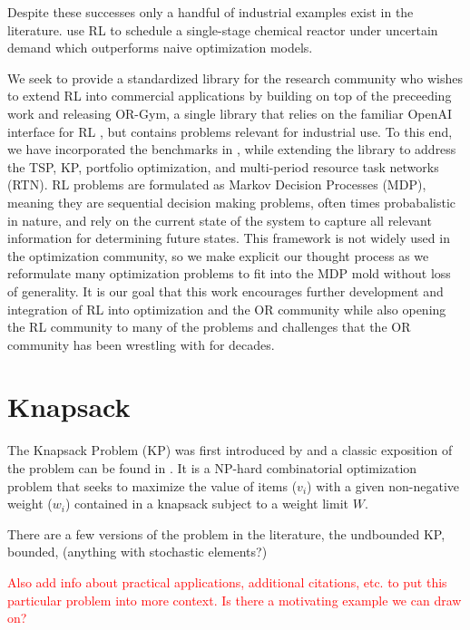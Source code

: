 \documentclass[12pt]{article}
\begin{document}
Despite these successes only a handful of industrial examples exist in the literature. 
\citet{Hubbs2020} use RL to schedule a single-stage chemical reactor under uncertain demand which outperforms naive optimization models. 

We seek to provide a standardized library for the research community who wishes to extend RL into commercial applications by building on top of the preceeding work and releasing OR-Gym, a single library that relies on the familiar OpenAI interface for RL \citep{Brockman2016}, but contains problems relevant for industrial use.
To this end, we have incorporated the benchmarks in \citet{Balaji2019}, while extending the library to address the TSP, KP, portfolio optimization, and multi-period resource task networks (RTN). 
RL problems are formulated as Markov Decision Processes (MDP), meaning they are sequential decision making problems, often times probabalistic in nature, and rely on the current state of the system to capture all relevant information for determining future states. %
This framework is not widely used in the optimization community, so we make explicit our thought process as we reformulate many optimization problems to fit into the MDP mold without loss of generality.
It is our goal that this work encourages further development and integration of RL into optimization and the OR community while also opening the RL community to many of the problems and challenges that the OR community has been wrestling with for decades.

\section{Knapsack}

The Knapsack Problem (KP) was first introduced by \citet{Mathews1896} and a classic exposition of the problem can be found in \citet{Dantzig1957}.
It is a NP-hard combinatorial optimization problem that seeks to maximize the value of items ($v_i$) with a given non-negative weight ($w_i$) contained in a knapsack subject to a weight limit $W$. 

There are a few versions of the problem in the literature, the undbounded KP, bounded, (anything with stochastic elements?)

\textcolor{red}{Also add info about practical applications, additional citations, etc. to put this particular problem into more context. Is there a motivating example we can draw on?}
\end{document}
